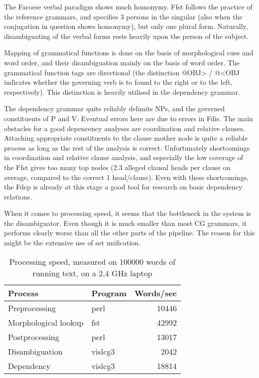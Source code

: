 \documentclass[a4paper,english]{article}
\begin{document}
The Faroese verbal paradigm shows much homonymy. Ffst follows the practice of the reference grammars, and specifies 3 persons in the singular (also when the conjugation in question shows homonymy), but only one plural form. Naturally, disambiguating of the verbal forms rests heavily upon the person of the subject. 

Mapping of grammatical functions is done on the basis of morphological cues and word order, and their disambiguation mainly on the basis of word order. The grammatical function tags are directional (the distinction @OBJ> / @<OBJ indicates whether the governing verb is to found to the right or to the left, respectively). This distinction is heavily utilised in the dependency grammar.

The dependency grammar quite reliably delimits NPs, and the governed constituents of P and V. Eventual errors here are due to errors in Fdis. The main obstacles for a good depencency analyses are coordination and relative clauses. Attaching appropriate constituents to the clause mother node is quite a reliable process as long as the rest of the analysis is correct. Unfortunately shortcomings in coordination and relative clause analysis, and especially the low coverage of the Ffst gives too many top nodes (2.3 alleged clausal heads per clause on average, compared to the correct 1 head/clause). Even with these shortcomings, the Fdep is already at this stage a good tool for research on basic dependency relations.

When it comes to processing speed, it seems that the bottleneck in the system is the disambiguator. Even though it is much smaller than most CG grammars, it performs clearly worse than all the other parts of the pipeline. The reason for this might be the extensive use of set unification.

\begin{table}[htdp]
\caption{Processing speed, measured on 100000 words of running text, on a 2,4 GHz laptop}
\begin{center}
\begin{tabular}{|l|l|r|}
\hline
Process & Program & Words/sec \\
\hline
Preprocessing & perl &10446 \\
Morphological lookup & fst & 42992 \\
Postprocessing & perl & 13017 \\
Disambiguation & vislcg3 & 2042 \\
Dependency & vislcg3 & 18814 \\
\hline
\end{tabular}
\end{center}
\label{time}
\end{table}%
\end{document}
